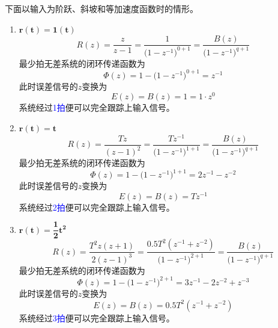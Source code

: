 \noindent 下面以输入为阶跃、斜坡和等加速度函数时的情形。
\begin{enumerate}[\hspace*{2em} 1. ]
	\item $\bm{r(t) = 1(t)}$
	\begin{equation}
		R(z) = \dfrac{z}{z-1} = \dfrac{1}{\big(1-z^{-1}\big)^{0+1}} = \dfrac{B(z)}{\big(1-z^{-1}\big)^{q+1}}
	\end{equation}
	最少拍无差系统的闭环传递函数为
	\begin{equation}
		\varPhi(z) = 1 - \big(1-z^{-1}\big)^{0+1} = z^{-1}
	\end{equation}
	此时误差信号的$z$变换为
	\begin{equation}
		E(z) = B(z) = 1 = 1\cdot z^0
	\end{equation}
	系统经过\textcolor{blue}{1拍}便可以完全跟踪上输入信号。
	\vspace*{0.5em}
	
	\item $\bm{r(t) = t}$
	\begin{equation}
		R(z) = \dfrac{Tz}{(z-1)^2} = \dfrac{Tz^{-1}}{\big(1-z^{-1}\big)^{1+1}} = \dfrac{B(z)}{\big(1-z^{-1}\big)^{q+1}}
	\end{equation}
	最少拍无差系统的闭环传递函数为
	\begin{equation}
		\varPhi(z) = 1 - \big(1-z^{-1}\big)^{1+1} = 2z^{-1} - z^{-2}
	\end{equation}
	此时误差信号的$z$变换为
	\begin{equation}
		E(z) = B(z) = T z^{-1}
	\end{equation}
	系统经过\textcolor{blue}{2拍}便可以完全跟踪上输入信号。
	\vspace*{1em}
	
	\item $\bm{r(t) = \dfrac{1}{2}t^2}$
	\begin{equation}
		R(z) = \dfrac{T^2z(z+1)}{2(z-1)^3} = \dfrac{0.5T^2(z^{-1}+z^{-2})}{\big(1-z^{-1}\big)^{2+1}} = \dfrac{B(z)}{\big(1-z^{-1}\big)^{q+1}}
	\end{equation}
	最少拍无差系统的闭环传递函数为
	\begin{equation}
		\varPhi(z) = 1 - \big(1-z^{-1}\big)^{2+1} = 3z^{-1} - 2z^{-2} + z^{-3}
	\end{equation}
	此时误差信号的$z$变换为
	\begin{equation}
		E(z) = B(z) = 0.5T^2(z^{-1}+z^{-2})
	\end{equation}
	系统经过\textcolor{blue}{3拍}便可以完全跟踪上输入信号。
\end{enumerate}

























